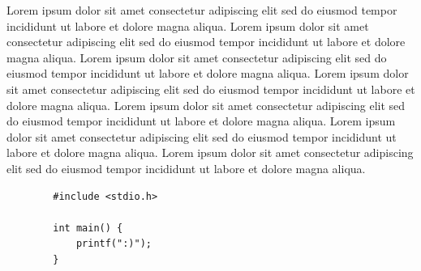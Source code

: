 \documentclass{report}
\begin{document}
    Lorem ipsum dolor sit amet consectetur adipiscing elit sed do eiusmod tempor incididunt ut labore et dolore magna aliqua.
    Lorem ipsum dolor sit amet consectetur adipiscing elit sed do eiusmod tempor incididunt ut labore et dolore magna aliqua.
    Lorem ipsum dolor sit amet consectetur adipiscing elit sed do eiusmod tempor incididunt ut labore et dolore magna aliqua.
    Lorem ipsum dolor sit amet consectetur adipiscing elit sed do eiusmod tempor incididunt ut labore et dolore magna aliqua.
    Lorem ipsum dolor sit amet consectetur adipiscing elit sed do eiusmod tempor incididunt ut labore et dolore magna aliqua.
    Lorem ipsum dolor sit amet consectetur adipiscing elit sed do eiusmod tempor incididunt ut labore et dolore magna aliqua.
    Lorem ipsum dolor sit amet consectetur adipiscing elit sed do eiusmod tempor incididunt ut labore et dolore magna aliqua.

	\begin{Verbatim}
		#include <stdio.h>

		int main() {
			printf(":)");
		}
	\end{Verbatim}

\end{document}
